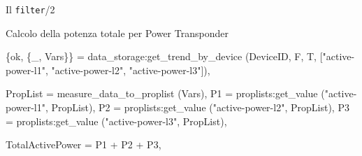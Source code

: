 \documentclass{beamer}
\newcommand{\red}[1]{\textcolor[rgb]{.8,0,0}{#1}}
\newcommand{\blue}[1]{\textcolor[rgb]{0,0,.7}{#1}}
\newcommand{\navy}[1]{\textcolor[rgb]{0,0,.5}{#1}}
\newcommand{\purple}[1]{\textcolor[rgb]{.7,0,.8}{#1}}
\begin{document}
%
\begin{frame}[fragile]{Il \texttt{filter}/2}
  \begin{exampleblock}{Calcolo della potenza totale per Power Transponder}
    \begin{semiverbatim}
      \begin{small}
\{ok, \{_, \blue{Vars}\}\} = 
  \red{data_storage:get_trend_by_device} (\blue{DeviceID}, F, T, 
                                   ["active-power-l1",
                                    "active-power-l2",
                                    "active-power-l3"]),
	      
\blue{PropList} = \red{measure_data_to_proplist} (\blue{Vars}),
\blue{P1} = \red{proplists:get_value} ("active-power-l1", \blue{PropList}),
\blue{P2} = \red{proplists:get_value} ("active-power-l2", \blue{PropList}),
\blue{P3} = \red{proplists:get_value} ("active-power-l3", \blue{PropList}),
	      
\blue{TotalActivePower} = \blue{P1} + \blue{P2} + \blue{P3}, 
\end{small}
    \end{semiverbatim}
  \end{exampleblock}
\end{frame}



\end{document}
